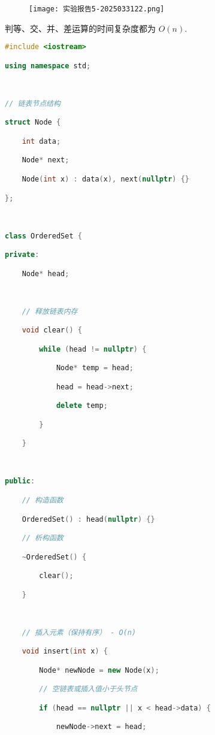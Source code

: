 \begin{figure}[H]
\centering
\texttt{[image: 实验报告5-2025033122.png]}
\label{}
\end{figure}

判等、交、并、差运算的时间复杂度都为 $O(n)$.

\begin{lstlisting}[language=C++]
#include <iostream>

using namespace std;

  

// 链表节点结构

struct Node {

    int data;

    Node* next;

    Node(int x) : data(x), next(nullptr) {}

};

  

class OrderedSet {

private:

    Node* head;

  

    // 释放链表内存

    void clear() {

        while (head != nullptr) {

            Node* temp = head;

            head = head->next;

            delete temp;

        }

    }

  

public:

    // 构造函数

    OrderedSet() : head(nullptr) {}

    // 析构函数

    ~OrderedSet() {

        clear();

    }

  

    // 插入元素（保持有序） - O(n)

    void insert(int x) {

        Node* newNode = new Node(x);

        // 空链表或插入值小于头节点

        if (head == nullptr || x < head->data) {

            newNode->next = head;


\end{lstlisting}
